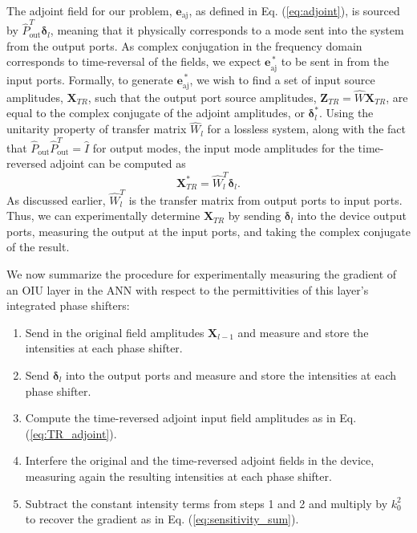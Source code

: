 The adjoint field for our problem, $\mathbf{e}_\textrm{aj}$, as defined in Eq. (\ref{eq:adjoint}), is sourced by $\hat{P}_{\textrm{out}}^T \boldsymbol{\delta}_l$, meaning that it physically corresponds to a mode sent into the system from the output ports.  As complex conjugation in the frequency domain corresponds to time-reversal of the fields, we expect $\mathbf{e}^{\,*}_{\textrm{aj}}$ to be sent in from the input ports. Formally, to generate $\mathbf{e}^{\,*}_{\textrm{aj}}$, we wish to find a set of input source amplitudes, $\mathbf{X}_{TR}$, such that the output port source amplitudes, $\mathbf{Z}_{TR} = \hat{W}\mathbf{X}_{TR}$, are equal to the complex conjugate of the adjoint amplitudes, or $\boldsymbol{\delta}_l^*$. Using the unitarity property of transfer matrix $\hat{W}_l$ for a lossless system, along with the fact that $\hat{P}_{\textrm{out}} \hat{P}_{\textrm{out}}^T = \hat{I}$ for output modes, the input mode amplitudes for the time-reversed adjoint can be computed as
\begin{equation}
\mathbf{X}_{TR}^* = \hat{W}_l^T\boldsymbol{\delta}_l.
\label{eq:TR_adjoint}
\end{equation}
As discussed earlier, $\hat{W}_l^T$ is the transfer matrix from output ports to input ports. Thus, we can experimentally determine $\mathbf{X}_{TR}$ by sending $\boldsymbol{\delta}_l$ into the device output ports, measuring the output at the input ports, and taking the complex conjugate of the result.

We now summarize the procedure for experimentally measuring the gradient of an OIU layer in the ANN with respect to the permittivities of this layer's integrated phase shifters:
\begin{enumerate}
  \itemsep0em 
  \item Send in the original field amplitudes $\mathbf{X}_{l-1}$ and measure and store the intensities at each phase shifter.
  \item Send $\boldsymbol{\delta}_l$ into the output ports and measure and store the intensities at each phase shifter.
  \item Compute the time-reversed adjoint input field amplitudes as in Eq. (\ref{eq:TR_adjoint}).
  \item Interfere the original and the time-reversed adjoint fields in the device, measuring again the resulting intensities at each phase shifter.
  \item Subtract the constant intensity terms from steps 1 and 2 and multiply by $k_0^2$ to recover the gradient as in Eq. (\ref{eq:sensitivity_sum}).
\end{enumerate}

